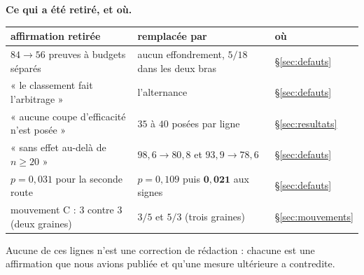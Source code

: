 \documentclass[11pt,a4paper]{article}
\theoremstyle{plain}
\theoremstyle{remark}
\begin{document}
\medskip\noindent
\textbf{Ce qui a été retiré, et où.}
\begin{center}
\setlength{\tabcolsep}{4pt}\small
\begin{tabular}{lll}
\toprule
affirmation retirée & remplacée par & où\\
\midrule
$84\to 56$ preuves à budgets séparés
  & aucun effondrement, $5/18$ dans les deux bras & \S\ref{sec:defauts}\\
« le classement fait l'arbitrage »
  & l'alternance & \S\ref{sec:defauts}\\
« aucune coupe d'efficacité n'est posée »
  & $35$ à $40$ posées par ligne & \S\ref{sec:resultats}\\
« sans effet au-delà de $n\ge 20$ »
  & $98{,}6\to 80{,}8$ et $93{,}9\to 78{,}6$ & \S\ref{sec:defauts}\\
$p=0{,}031$ pour la seconde route
  & $p=0{,}109$ puis $\mathbf{0{,}021}$ aux signes & \S\ref{sec:defauts}\\
mouvement C : $3$ contre $3$ (deux graines)
  & $3/5$ et $5/3$ (trois graines) & \S\ref{sec:mouvements}\\
\bottomrule
\end{tabular}
\end{center}

\noindent
Aucune de ces lignes n'est une correction de rédaction : chacune est une
affirmation que nous avions publiée et qu'une mesure ultérieure a
contredite.
\end{document}
